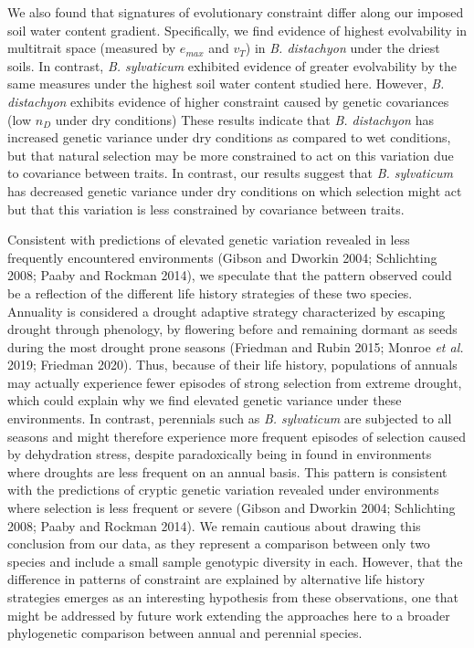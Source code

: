 \documentclass[jou,floatsintext]{apa6}
\begin{document}
We also found that signatures of evolutionary constraint differ along our imposed soil water content gradient. Specifically, we find evidence of highest evolvability in multitrait space (measured by \(e_{max}\) and \(v_T\)) in \emph{B. distachyon} under the driest soils. In contrast, \emph{B. sylvaticum} exhibited evidence of greater evolvability by the same measures under the highest soil water content studied here. However, \emph{B. distachyon} exhibits evidence of higher constraint caused by genetic covariances (low \(n_D\) under dry conditions) These results indicate that \emph{B. distachyon} has increased genetic variance under dry conditions as compared to wet conditions, but that natural selection may be more constrained to act on this variation due to covariance between traits. In contrast, our results suggest that \emph{B. sylvaticum} has decreased genetic variance under dry conditions on which selection might act but that this variation is less constrained by covariance between traits.

Consistent with predictions of elevated genetic variation revealed in less frequently encountered environments (Gibson and Dworkin 2004; Schlichting 2008; Paaby and Rockman 2014), we speculate that the pattern observed could be a reflection of the different life history strategies of these two species. Annuality is considered a drought adaptive strategy characterized by escaping drought through phenology, by flowering before and remaining dormant as seeds during the most drought prone seasons (Friedman and Rubin 2015; Monroe \emph{et al.} 2019; Friedman 2020). Thus, because of their life history, populations of annuals may actually experience fewer episodes of strong selection from extreme drought, which could explain why we find elevated genetic variance under these environments. In contrast, perennials such as \emph{B. sylvaticum} are subjected to all seasons and might therefore experience more frequent episodes of selection caused by dehydration stress, despite paradoxically being in found in environments where droughts are less frequent on an annual basis. This pattern is consistent with the predictions of cryptic genetic variation revealed under environments where selection is less frequent or severe (Gibson and Dworkin 2004; Schlichting 2008; Paaby and Rockman 2014). We remain cautious about drawing this conclusion from our data, as they represent a comparison between only two species and include a small sample genotypic diversity in each. However, that the difference in patterns of constraint are explained by alternative life history strategies emerges as an interesting hypothesis from these observations, one that might be addressed by future work extending the approaches here to a broader phylogenetic comparison between annual and perennial species.
\end{document}
